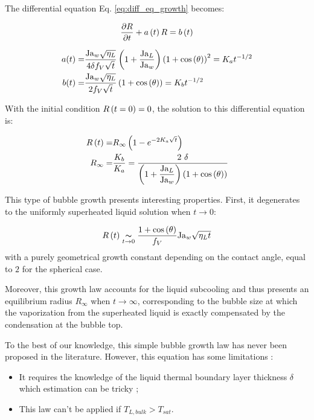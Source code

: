 \npar

The differential equation Eq. \ref{eq:diff_eq_growth} becomes:

\begin{align}
\frac{\partial{R}}{\partial t}+a\left( t \right)R=b\left( t \right)
\end{align}

\begin{align}
a(t)=&\frac{\mathrm{Ja}_{w}\sqrt{\eta_{L}}}{4\delta f_{V}\sqrt{t}}\left( 1+\frac{\mathrm{Ja}_{L}}{\mathrm{Ja}_{w}} \right)\left( 1+\mathrm{cos}\left( \theta \right) \right)^{2}=K_{a}t^{-1/2} \\
b(t)=&\frac{\mathrm{Ja}_{w}\sqrt{\eta_{L}}}{2f_{V} \sqrt{t}}\left( 1+\mathrm{cos}\left( \theta \right) \right)=K_ {b}t^{-1/2}
\label{eq:coeff_expgrowth}
\end{align}

\npar

With the initial condition $R\left( t=0 \right)=0$, the solution to this differential equation is: 

\begin{align}
R\parth{t}=&R_{\infty}\parth{1-e^{-2K_{a}\sqrt{t}}}
\label{eq:exp_growth} \\
R_{\infty}=&\frac{K_{b}}{K_{a}} = \frac{2\ \delta}{\parth{1+\dfrac{\Ja_{L}}{\Ja_{w}} } \parth{1+\cos{\theta} } }
\label{eq:eq_radius_expgrowth}
\end{align}

\npar

This type of bubble growth presents interesting properties. First, it degenerates to the uniformly superheated liquid solution when $t \to 0$:

\begin{equation}
R\left( t \right) \underset{t \to 0}{\thicksim} \frac{1+\mathrm{cos}\left( \theta \right)}{f_{V}}\mathrm{Ja}_{w} \sqrt{\eta_{L}t}
\end{equation}
with a purely geometrical growth constant depending on the contact angle, equal to $2$ for the spherical case.

\npar
Moreover, this growth law accounts for the liquid subcooling and thus presents an equilibrium radius $R_{\infty}$ when $t\to \infty$, corresponding to the bubble size at which the vaporization from the superheated liquid is exactly compensated by the condensation at the bubble top.

\npar
To the best of our knowledge, this simple bubble growth law has never been proposed in the literature. However, this equation has some limitations :

\begin{itemize}
\item It requires the knowledge of the liquid thermal boundary layer thickness $\delta$ which estimation can be tricky ;

\item This law can't be applied if $T_{L,bulk}>T_{sat}$.
\end{itemize} 



